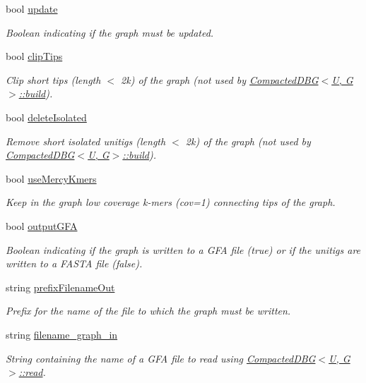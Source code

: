 \begin{DoxyCompactItemize}
bool \hyperlink{structCDBG__Build__opt_a19fd0874dfc472a56d5c7bf375d849e8}{update}
\begin{DoxyCompactList}\small\item\em Boolean indicating if the graph must be updated. \end{DoxyCompactList}\item 
bool \hyperlink{structCDBG__Build__opt_a7e916ec6f4674bf1239b64da22bac9ee}{clip\+Tips}
\begin{DoxyCompactList}\small\item\em Clip short tips (length $<$ 2k) of the graph (not used by \hyperlink{classCompactedDBG_a6021ad2fe7b11998b886bc5fd9e1a4ba}{Compacted\+D\+B\+G$<$\+U, G$>$\+::build}). \end{DoxyCompactList}\item 
bool \hyperlink{structCDBG__Build__opt_ae5c727e6d5b10764d03556f570ab5f5d}{delete\+Isolated}
\begin{DoxyCompactList}\small\item\em Remove short isolated unitigs (length $<$ 2k) of the graph (not used by \hyperlink{classCompactedDBG_a6021ad2fe7b11998b886bc5fd9e1a4ba}{Compacted\+D\+B\+G$<$\+U, G$>$\+::build}). \end{DoxyCompactList}\item 
bool \hyperlink{structCDBG__Build__opt_a6986d2570dc42f602b4ed884ff5b9084}{use\+Mercy\+Kmers}
\begin{DoxyCompactList}\small\item\em Keep in the graph low coverage k-\/mers (cov=1) connecting tips of the graph. \end{DoxyCompactList}\item 
bool \hyperlink{structCDBG__Build__opt_a59256092145b2e12068a0874e3bffa94}{output\+G\+FA}
\begin{DoxyCompactList}\small\item\em Boolean indicating if the graph is written to a G\+FA file (true) or if the unitigs are written to a F\+A\+S\+TA file (false). \end{DoxyCompactList}\item 
string \hyperlink{structCDBG__Build__opt_a65f1dfdab74608283293c69e4bad60ba}{prefix\+Filename\+Out}
\begin{DoxyCompactList}\small\item\em Prefix for the name of the file to which the graph must be written. \end{DoxyCompactList}\item 
string \hyperlink{structCDBG__Build__opt_a121574067fffe9fa3c0c280ec633ffc3}{filename\+\_\+graph\+\_\+in}
\begin{DoxyCompactList}\small\item\em String containing the name of a G\+FA file to read using \hyperlink{classCompactedDBG_a0930cb63a158caa70f4dcd425a088fb4}{Compacted\+D\+B\+G$<$\+U, G$>$\+::read}. \end{DoxyCompactList}\end{DoxyCompactItemize}


